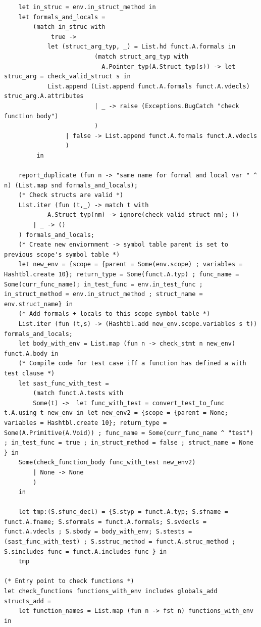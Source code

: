\documentclass{article}
\begin{document}
\begin{lstlisting}
	let in_struc = env.in_struct_method in
	let formals_and_locals =
		(match in_struc with
			 true ->
			let (struct_arg_typ, _) = List.hd funct.A.formals in
                         (match struct_arg_typ with
                           A.Pointer_typ(A.Struct_typ(s)) -> let struc_arg = check_valid_struct s in 
			List.append (List.append funct.A.formals funct.A.vdecls) struc_arg.A.attributes
                         | _ -> raise (Exceptions.BugCatch "check function body")
                         )
                 | false -> List.append funct.A.formals funct.A.vdecls
                 )
         in

	report_duplicate (fun n -> "same name for formal and local var " ^ n) (List.map snd formals_and_locals);
	(* Check structs are valid *)
	List.iter (fun (t,_) -> match t with 
			A.Struct_typ(nm) -> ignore(check_valid_struct nm); ()
		| _ -> ()
	) formals_and_locals;
	(* Create new enviornment -> symbol table parent is set to previous scope's symbol table *)
	let new_env = {scope = {parent = Some(env.scope) ; variables = Hashtbl.create 10}; return_type = Some(funct.A.typ) ; func_name = Some(curr_func_name); in_test_func = env.in_test_func ; in_struct_method = env.in_struct_method ; struct_name = env.struct_name} in
	(* Add formals + locals to this scope symbol table *)
	List.iter (fun (t,s) -> (Hashtbl.add new_env.scope.variables s t)) formals_and_locals;
	let body_with_env = List.map (fun n -> check_stmt n new_env) funct.A.body in
	(* Compile code for test case iff a function has defined a with test clause *)
	let sast_func_with_test = 
		(match funct.A.tests with
		Some(t) ->  let func_with_test = convert_test_to_func t.A.using t new_env in let new_env2 = {scope = {parent = None; variables = Hashtbl.create 10}; return_type = Some(A.Primitive(A.Void)) ; func_name = Some(curr_func_name ^ "test") ; in_test_func = true ; in_struct_method = false ; struct_name = None } in
	Some(check_function_body func_with_test new_env2) 
		| None -> None
		)
	in	
		
	let tmp:(S.sfunc_decl) = {S.styp = funct.A.typ; S.sfname = funct.A.fname; S.sformals = funct.A.formals; S.svdecls = funct.A.vdecls ; S.sbody = body_with_env; S.stests = (sast_func_with_test) ; S.sstruc_method = funct.A.struc_method ; S.sincludes_func = funct.A.includes_func } in
	tmp

(* Entry point to check functions *)
let check_functions functions_with_env includes globals_add structs_add = 
	let function_names = List.map (fun n -> fst n) functions_with_env in 
	

\end{lstlisting}
\end{document}
